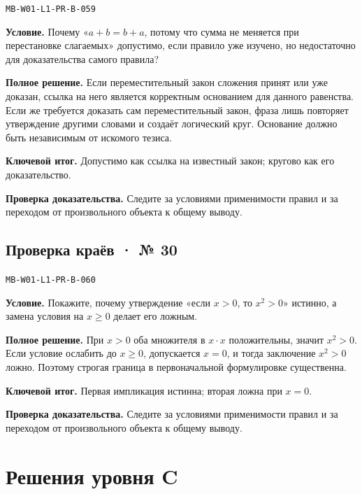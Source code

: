 \documentclass[11pt,a4paper,openany]{book}
\newcommand{\muid}[1]{\texttt{\footnotesize #1}}
\begin{document}
\muid{MB-W01-L1-PR-B-059}\par

\textbf{Условие.} Почему «$a+b=b+a$, потому что сумма не меняется при перестановке слагаемых» допустимо, если правило уже изучено, но недостаточно для доказательства самого правила?\par

\textbf{Полное решение.} Если переместительный закон сложения принят или уже доказан, ссылка на него является корректным основанием для данного равенства. Если же требуется доказать сам переместительный закон, фраза лишь повторяет утверждение другими словами и создаёт логический круг. Основание должно быть независимым от искомого тезиса.


\begin{learnbox}\textbf{Ключевой итог.} Допустимо как ссылка на известный закон; кругово как его доказательство.\par \textbf{Проверка доказательства.} 
Следите за условиями применимости правил и за переходом от произвольного объекта к общему выводу. 
\end{learnbox}

\subsection*{Проверка краёв · № 30}\hypertarget{solution:MB-W01-L1-PR-B-060}{}

\muid{MB-W01-L1-PR-B-060}\par

\textbf{Условие.} Покажите, почему утверждение «если $x>0$, то $x^2>0$» истинно, а замена условия на $x\ge0$ делает его ложным.\par

\textbf{Полное решение.} При $x>0$ оба множителя в $x\cdot x$ положительны, значит $x^2>0$. Если условие ослабить до $x\ge0$, допускается $x=0$, и тогда заключение $x^2>0$ ложно. Поэтому строгая граница в первоначальной формулировке существенна.


\begin{learnbox}\textbf{Ключевой итог.} Первая импликация истинна; вторая ложна при $x=0$.\par \textbf{Проверка доказательства.} 
Следите за условиями применимости правил и за переходом от произвольного объекта к общему выводу. 
\end{learnbox}

\section{Решения уровня C}
\end{document}
